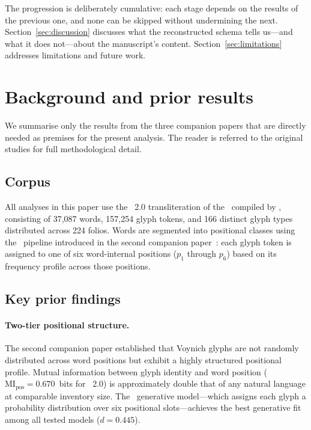 The progression is deliberately cumulative: each stage depends on the
results of the previous one, and none can be skipped without undermining
the next. Section~\ref{sec:discussion} discusses what the reconstructed
schema tells us---and what it does not---about the manuscript's
content. Section~\ref{sec:limitations} addresses limitations and
future work.


\section{Background and prior results}
\label{sec:background}

We summarise only the results from the three companion papers that are
directly needed as premises for the present analysis. The reader is
referred to the original studies for full methodological detail.

\subsection{Corpus}

All analyses in this paper use the \sta\ 2.0 transliteration of the
\vms\ compiled by \citet{zandbergen_sta1}, consisting of 37,087 words,
157,254 glyph tokens, and 166 distinct glyph types distributed across
224 folios. Words are segmented into positional classes using the
\silpart\ pipeline introduced in the second companion
paper~\citep{jimenez2026twotier}: each glyph token is assigned to one
of six word-internal positions ($p_1$ through $p_6$) based on its
frequency profile across those positions.

\subsection{Key prior findings}

\paragraph{Two-tier positional structure.}
The second companion paper established that Voynich glyphs are not
randomly distributed across word positions but exhibit a highly
structured positional profile. Mutual information between glyph identity
and word position ($\mathrm{MI}_{\text{pos}} = 0.670$~bits for
\sta\ 2.0) is approximately double that of any natural language at
comparable inventory size. The \silpart\ generative model---which
assigns each glyph a probability distribution over six positional
slots---achieves the best generative fit among all tested models
($d = 0.445$).

